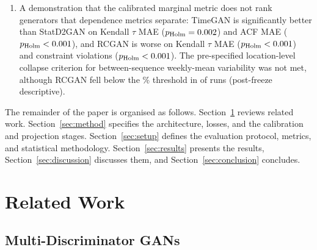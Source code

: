 \documentclass[preprint,12pt]{elsarticle}
\begin{document}
\begin{enumerate}
        marginal-independent calibration map rather than by the generator
        (raw violation rates at most \physRawBergen{} against
        \physCalAnkara{} to \physCalYakutsk{} after calibration), and a
        constraint projection step that eliminates them in all
        \nProjRuns{} full-model runs at a small, run-dependent
        distributional cost: the median change in KS is \dKsMedianAll{} and
        the maximum \dKsMaxLhasa, but the pre-specified tolerance,
        \protoDFiveFrac{} times the mean reference distance across locations,
        is exceeded in \phDKsLocsOverThrWord{} locations
        (\phDKsLocsOverThrList; post-freeze descriptive), so this
        prediction was not borne out.
  \item A demonstration that the calibrated marginal metric does not
        rank generators that dependence metrics separate: TimeGAN is
        significantly better than StatD2GAN on Kendall $\tau$ MAE
        ($p_{\mathrm{Holm}}=0.002$) and ACF MAE
        ($p_{\mathrm{Holm}}<0.001$), and RCGAN is worse on
        Kendall $\tau$ MAE ($p_{\mathrm{Holm}}<0.001$) and
        constraint violations ($p_{\mathrm{Holm}}<0.001$).
        The pre-specified location-level collapse criterion for
        between-sequence weekly-mean variability was not met, although
        RCGAN fell below the \protoDSixPct\% threshold in
        \phSeedsBelowTenRcgan{} of \phSeedsPerModel{} runs (post-freeze
        descriptive).
\end{enumerate}

The remainder of the paper is organised as follows.
Section~\ref{sec:related} reviews related work.
Section~\ref{sec:method} specifies the architecture, losses, and the
calibration and projection stages.  Section~\ref{sec:setup} defines the
evaluation protocol, metrics, and statistical methodology.
Section~\ref{sec:results} presents the results,
Section~\ref{sec:discussion} discusses them, and
Section~\ref{sec:conclusion} concludes.

\section{Related Work}
\label{sec:related}

\subsection{Multi-Discriminator GANs}
\end{document}

